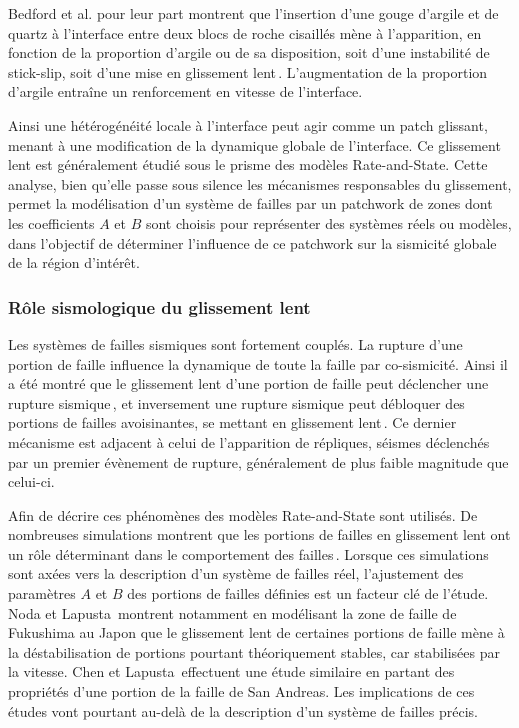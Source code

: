 Bedford et al. pour leur part montrent que l'insertion d'une gouge d'argile et de quartz à l'interface entre deux blocs de roche cisaillés mène à l'apparition, en fonction de la proportion d'argile ou de sa disposition, soit d'une instabilité de stick-slip, soit d'une mise en glissement lent\,\cite{bedford_fault_2022}. L'augmentation de la proportion d'argile entraîne un renforcement en vitesse de l'interface.



Ainsi une hétérogénéité locale à l'interface peut agir comme un patch glissant, menant à une modification de la dynamique globale de l'interface. Ce glissement lent est généralement étudié sous le prisme des modèles Rate-and-State. Cette analyse, bien qu'elle passe sous silence les mécanismes responsables du glissement, permet la modélisation d'un système de failles par un patchwork de zones dont les coefficients $A$ et $B$ sont choisis pour représenter des systèmes réels ou modèles, dans l'objectif de déterminer l'influence de ce patchwork sur la sismicité globale de la région d'intérêt.


\subsubsection{Rôle sismologique du glissement lent}

Les systèmes de failles sismiques sont fortement couplés. La rupture d'une portion de faille influence la dynamique de toute la faille par {co-sismicité}. Ainsi il a été montré que le glissement lent d'une portion de faille peut déclencher une rupture sismique\,\cite{radiguet_triggering_2016}, et inversement une rupture sismique peut débloquer des portions de failles avoisinantes, se mettant en glissement lent\,\cite{ozawa_coseismic_2011,chlieh_coseismic_2007}. Ce dernier mécanisme est adjacent à celui de l'apparition de répliques, séismes déclenchés par un premier évènement de rupture, généralement de plus faible magnitude que celui-ci.


Afin de décrire ces phénomènes des modèles Rate-and-State sont utilisés. De nombreuses simulations montrent que les portions de failles en glissement lent ont un rôle déterminant dans le comportement des failles\,\cite{lui_repeating_2016,noda_stable_2013,harris_large_2017,radiguet_survival_2013,chen_scaling_2009, romanet_fast_2018}. Lorsque ces simulations sont axées vers la description d'un système de failles réel, l'ajustement des paramètres $A$ et $B$ des portions de failles définies est un facteur clé de l'étude. Noda et Lapusta\,\cite{noda_stable_2013} montrent notamment en modélisant la zone de faille de Fukushima au Japon que le glissement lent de certaines portions de faille mène à la déstabilisation de portions pourtant théoriquement stables, car stabilisées par la vitesse. Chen et Lapusta\,\cite{chen_scaling_2009} effectuent une étude similaire en partant des propriétés d'une portion de la faille de San Andreas. Les implications de ces études vont pourtant au-delà de la description d'un système de failles précis.

